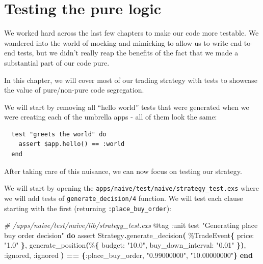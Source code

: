 \documentclass[
  oneside]{book}
\newenvironment{Shaded}{\begin{snugshade}}{\end{snugshade}}
\newcommand{\CommentTok}[1]{\textcolor[rgb]{0.56,0.35,0.01}{\textit{#1}}}
\newcommand{\ConstantTok}[1]{\textcolor[rgb]{0.56,0.35,0.01}{#1}}
\newcommand{\FunctionTok}[1]{\textcolor[rgb]{0.13,0.29,0.53}{\textbf{#1}}}
\newcommand{\KeywordTok}[1]{\textcolor[rgb]{0.13,0.29,0.53}{\textbf{#1}}}
\newcommand{\NormalTok}[1]{#1}
\newcommand{\OperatorTok}[1]{\textcolor[rgb]{0.81,0.36,0.00}{\textbf{#1}}}
\newcommand{\OtherTok}[1]{\textcolor[rgb]{0.56,0.35,0.01}{#1}}
\newcommand{\StringTok}[1]{\textcolor[rgb]{0.31,0.60,0.02}{#1}}
\newcommand{\VariableTok}[1]{\textcolor[rgb]{0.00,0.00,0.00}{#1}}
\begin{document}
\section{Testing the pure logic}\label{testing-the-pure-logic}

We worked hard across the last few chapters to make our code more testable. We wandered into the world of mocking and mimicking to allow us to write end-to-end tests, but we didn't really reap the benefits of the fact that we made a substantial part of our code pure.

In this chapter, we will cover most of our trading strategy with tests to showcase the value of pure/non-pure code segregation.

We will start by removing all ``hello world'' tests that were generated when we were creating each of the umbrella apps - all of them look the same:

\begin{verbatim}
  test "greets the world" do
    assert $app.hello() == :world
  end
\end{verbatim}

After taking care of this nuisance, we can now focus on testing our strategy.

We will start by opening the \texttt{apps/naive/test/naive/strategy\_test.exs} where we will add tests of \texttt{generate\_decision/4} function. We will test each clause starting with the first (returning \texttt{:place\_buy\_order}):

\begin{Shaded}
\begin{Highlighting}[]
  \CommentTok{\# /apps/naive/test/naive/lib/strategy\_test.exs}
  \OtherTok{@tag} \VariableTok{:unit}
\NormalTok{  test }\StringTok{"Generating place buy order decision"} \KeywordTok{do}
\NormalTok{    assert }\ConstantTok{Strategy}\OperatorTok{.}\NormalTok{generate\_decision}\FunctionTok{(}
\NormalTok{             \%}\ConstantTok{TradeEvent}\FunctionTok{\{}
               \VariableTok{price:} \StringTok{"1.0"}
             \FunctionTok{\}}\NormalTok{,}
\NormalTok{             generate\_position}\FunctionTok{(}\NormalTok{\%}\FunctionTok{\{}
               \VariableTok{budget:} \StringTok{"10.0"}\NormalTok{,}
               \VariableTok{buy\_down\_interval:} \StringTok{"0.01"}
             \FunctionTok{\})}\NormalTok{,}
             \VariableTok{:ignored}\NormalTok{,}
             \VariableTok{:ignored}
           \FunctionTok{)} \OperatorTok{==} \FunctionTok{\{}\VariableTok{:place\_buy\_order}\NormalTok{, }\StringTok{"0.99000000"}\NormalTok{, }\StringTok{"10.00000000"}\FunctionTok{\}}
  \KeywordTok{end}
\end{Highlighting}
\end{Shaded}
\end{document}
